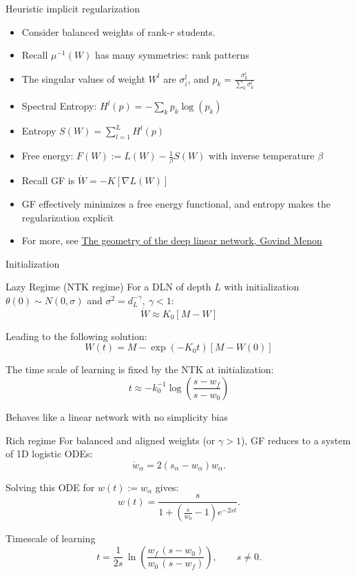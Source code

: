 \documentclass[aspectratio=169]{beamer}
\newcommand{\sectionframe}[1]{%
  \begin{frame}[plain]
    \centering
    \vfill
    {\Huge #1}
    \vfill
  \end{frame}
}
\begin{document}
\begin{frame}{Heuristic implicit regularization}
  \small
  \begin{itemize}
    \item Consider balanced weights of rank-$r$ students.
    \item Recall $\mu^{-1}(W)$ has many symmetries: rank patterns
    \item The singular values of weight $W^l$ are $\sigma^l_i$, and $p_k = \frac{\sigma^l_k}{\sum_k \sigma^l_k}$
    \item Spectral Entropy: $H^l(p)= - \sum_k p_k \log(p_k)$
    \item Entropy $S(W)=\sum_{l=1}^L H^l(p)$
    \item Free energy: $F(W) := L(W) - \frac{1}{\beta}S(W)$ with inverse temperature $\beta$
    \item Recall GF is $\dot{W}=-K[\nabla L(W)]$
    \item GF effectively minimizes a free energy functional, and entropy makes the regularization explicit
    \item For more, see \href{https://arxiv.org/abs/2411.09004}{The geometry of the deep linear network, Govind Menon}
  \end{itemize}
\end{frame}

\sectionframe{Initialization}

\begin{frame}{Lazy Regime (NTK regime)}
  \small
  For a DLN of depth $L$ with initialization $\theta(0)\sim N(0,\sigma)$ and $\sigma^2 = d_L^{-\gamma}, \ \gamma < 1$:
  \[
    \dot{W} \approx K_0[M - W]
  \]

  Leading to the following solution:
  \[
    W(t) = M - \exp(-K_0 t)[M - W(0)]
  \]

  The time scale of learning is fixed by the NTK at initialization:
  \[
    t \approx -k_0^{-1}\log\left(\frac{s - w_f}{s - w_0}\right)
  \]

  Behaves like a linear network with no simplicity bias
\end{frame}

\begin{frame}{Rich regime}
  \small
  For balanced and aligned weights (or $\gamma >1$), GF reduces to a system of 1D logistic ODEs:
  \[
    \dot{w}_{\alpha} = 2\left(s_{\alpha} - w_{\alpha}\right)w_{\alpha}.
  \]

  Solving this ODE for $w(t):=w_{\alpha}$ gives:
  \[
    w(t)=\frac{s}{1+\left(\frac{s}{w_0}-1\right)e^{-2s t}}.
  \]

  Timescale of learning
  \[
    t=\frac{1}{2s}\,\ln\!\left(\frac{w_f\,(s-w_0)}{w_0\,(s-w_f)}\right), \qquad s\neq 0.
  \]
\end{frame}
\end{document}

